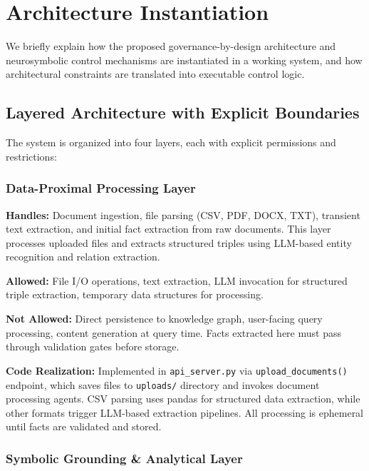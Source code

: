 \section{Architecture Instantiation}

We briefly explain how the proposed governance-by-design architecture and neurosymbolic control mechanisms are instantiated in a working system, and how architectural constraints are translated into executable control logic.


\subsection{Layered Architecture with Explicit Boundaries}

The system is organized into four layers, each with explicit permissions and restrictions:

\subsubsection{Data-Proximal Processing Layer}

\textbf{Handles:} Document ingestion, file parsing (CSV, PDF, DOCX, TXT), transient text extraction, and initial fact extraction from raw documents. This layer processes uploaded files and extracts structured triples using LLM-based entity recognition and relation extraction.

\textbf{Allowed:} File I/O operations, text extraction, LLM invocation for structured triple extraction, temporary data structures for processing.

\textbf{Not Allowed:} Direct persistence to knowledge graph, user-facing query processing, content generation at query time. Facts extracted here must pass through validation gates before storage.

\textbf{Code Realization:} Implemented in \texttt{api\_server.py} via \texttt{upload\_documents()} endpoint, which saves files to \texttt{uploads/} directory and invokes document processing agents. CSV parsing uses pandas for structured data extraction, while other formats trigger LLM-based extraction pipelines. All processing is ephemeral until facts are validated and stored.

\subsubsection{Symbolic Grounding \& Analytical Layer}

